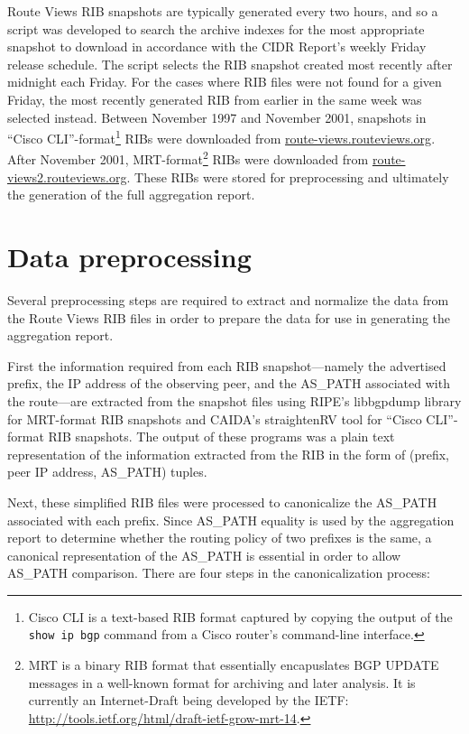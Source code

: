 Route Views RIB snapshots are typically generated every two hours, and so a
script was developed to search the archive indexes for the most appropriate
snapshot to download in accordance with the CIDR Report's weekly Friday release
schedule. The script selects the RIB snapshot created most recently after
midnight each Friday. For the cases where RIB files were not found for a given
Friday, the most recently generated RIB from earlier in the same week was
selected instead. Between November 1997 and November 2001, snapshots in ``Cisco
CLI''-format\footnote{Cisco CLI is a text-based RIB format captured by copying
the output of the \texttt{show ip bgp} command from a Cisco router's
command-line interface.} RIBs were downloaded from
\url{route-views.routeviews.org}. After November 2001, MRT-format\footnote{MRT
is a binary RIB format that essentially encapuslates BGP UPDATE messages in a
well-known format for archiving and later analysis. It is currently an
Internet-Draft being developed by the IETF:
\url{http://tools.ietf.org/html/draft-ietf-grow-mrt-14}.} RIBs were downloaded
from \url{route-views2.routeviews.org}. These RIBs were stored for
preprocessing and ultimately the generation of the full aggregation report.

\section{Data preprocessing}

Several preprocessing steps are required to extract and normalize the data from
the Route Views RIB files in order to prepare the data for use in generating
the aggregation report.

First the information required from each RIB snapshot---namely the advertised
prefix, the IP address of the observing peer, and the AS\_PATH associated with
the route---are extracted from the snapshot files using RIPE's libbgpdump
library \cite{libbgpdump} for MRT-format RIB snapshots and CAIDA's straightenRV
tool \cite{straightenrv} for ``Cisco CLI''-format RIB snapshots. The output of
these programs was a plain text representation of the information extracted
from the RIB in the form of (prefix, peer IP address, AS\_PATH) tuples.

Next, these simplified RIB files were processed to canonicalize the AS\_PATH
associated with each prefix. Since AS\_PATH equality is used by the aggregation
report to determine whether the routing policy of two prefixes is the same, a
canonical representation of the AS\_PATH is essential in order to allow
AS\_PATH comparison. There are four steps in the canonicalization process:

